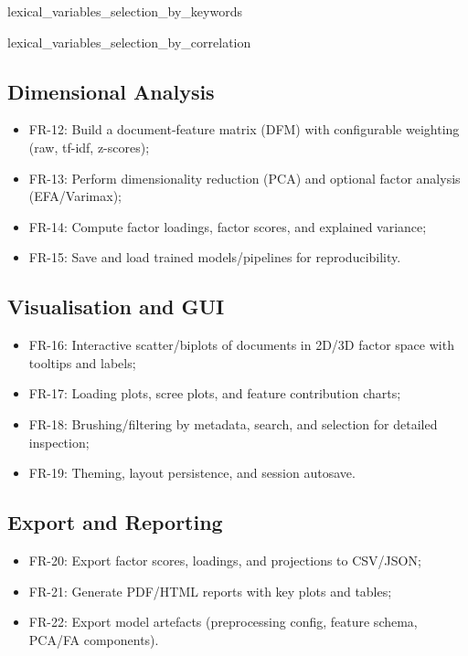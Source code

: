 {lexical_variables_selection_by_keywords}

{lexical_variables_selection_by_correlation}

\subsection{Dimensional Analysis}
\begin{itemize}
    \item FR-12: Build a document-feature matrix (DFM) with configurable weighting (raw, tf-idf, z-scores);
    \item FR-13: Perform dimensionality reduction (PCA) and optional factor analysis (EFA/Varimax);
    \item FR-14: Compute factor loadings, factor scores, and explained variance;
    \item FR-15: Save and load trained models/pipelines for reproducibility.
\end{itemize}

\subsection{Visualisation and GUI}
\begin{itemize}
    \item FR-16: Interactive scatter/biplots of documents in 2D/3D factor space with tooltips and labels;
    \item FR-17: Loading plots, scree plots, and feature contribution charts;
    \item FR-18: Brushing/filtering by metadata, search, and selection for detailed inspection;
    \item FR-19: Theming, layout persistence, and session autosave.
\end{itemize}

\subsection{Export and Reporting}
\begin{itemize}
    \item FR-20: Export factor scores, loadings, and projections to CSV/JSON;
    \item FR-21: Generate PDF/HTML reports with key plots and tables;
    \item FR-22: Export model artefacts (preprocessing config, feature schema, PCA/FA components).
\end{itemize}

